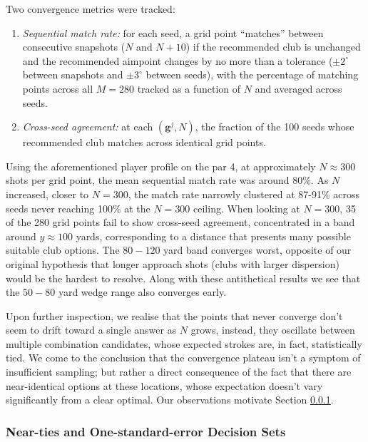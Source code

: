 \documentclass[11pt, letterpaper]{article}
\begin{document}
Two convergence metrics were tracked: 
\begin{enumerate}
    \item \textit{Sequential match rate:} for each seed, a grid point ``matches'' between consecutive snapshots ($N$ and $N+10$) if the recommended club is unchanged and the recommended aimpoint changes by no more than a tolerance ($\pm 2^\circ$ between snapshots and $\pm3^\circ$  between seeds), with the percentage of matching points across all $M = 280$ tracked as a function of $N$ and averaged across seeds.
    \item \textit{Cross-seed agreement:} at each $(\mathbf{g}^j, N)$, the fraction of the 100 seeds whose recommended club matches across identical grid points.
\end{enumerate}

Using the aforementioned player profile on the par 4, at approximately $N \approx 300$ shots per grid point, the mean sequential match rate was around 80\%. As $N$ increased, closer to $N = 300$, the match rate narrowly clustered at 87-91\% across seeds never reaching 100\% at the $N = 300$ ceiling. When looking at $N = 300$, 35 of the 280 grid points fail to show cross-seed agreement, concentrated in a band around $y \approx 100$ yards, corresponding to a distance that presents many possible suitable club options. The $80-120$ yard band converges worst, opposite of our original hypothesis that longer approach shots (clubs with larger dispersion) would be the hardest to resolve. Along with these antithetical results we see that the $50-80$ yard wedge range also converges early. 

Upon further inspection, we realise that the points that never converge don't seem to drift toward a single answer as $N$ grows, instead, they oscillate between multiple combination candidates, whose expected strokes are, in fact, statistically tied. We come to the conclusion that the convergence plateau isn't a symptom of insufficient sampling; but rather a direct consequence of the fact that there are near-identical options at these locations, whose expectation doesn't vary significantly from a clear optimal. Our observations motivate Section \ref{subsec:Options}.



\subsubsection{Near-ties and One-standard-error Decision Sets}
\label{subsec:Options}
\end{document}
